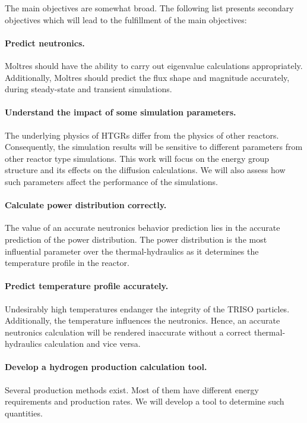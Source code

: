 \vskip 0.6cm
The main objectives are somewhat broad.
The following list presents secondary objectives which will lead to the fulfillment of the main objectives:

\paragraph{Predict neutronics.}
Moltres should have the ability to carry out eigenvalue calculations appropriately.
Additionally, Moltres should predict the flux shape and magnitude accurately, during steady-state and transient simulations.

\paragraph{Understand the impact of some simulation parameters.}
The underlying physics of \glspl{HTGR} differ from the physics of other reactors.
Consequently, the simulation results will be sensitive to different parameters from other reactor type simulations.
This work will focus on the energy group structure and its effects on the diffusion calculations.
We will also assess how such parameters affect the performance of the simulations. 

\paragraph{Calculate power distribution correctly.}
The value of an accurate neutronics behavior prediction lies in the accurate prediction of the power distribution.
The power distribution is the most influential parameter over the thermal-hydraulics as it determines the temperature profile in the reactor.

\paragraph{Predict temperature profile accurately.}
Undesirably high temperatures endanger the integrity of the TRISO particles.
Additionally, the temperature influences the neutronics.
Hence, an accurate neutronics calculation will be rendered inaccurate without a correct thermal-hydraulics calculation and vice versa. 

\paragraph{Develop a hydrogen production calculation tool.}
Several production methods exist.
Most of them have different energy requirements and production rates.
We will develop a tool to determine such quantities.